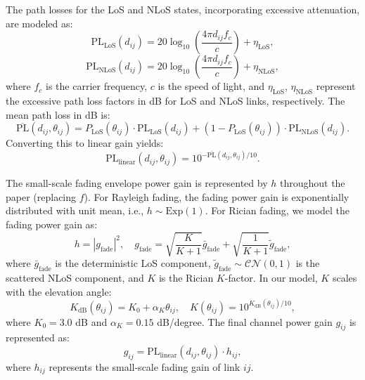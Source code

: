 \documentclass[journal,onecolumn]{IEEEtran}
\begin{document}
The path losses for the LoS and NLoS states, incorporating excessive attenuation, are modeled as:
\begin{equation}
    \text{PL}_{\text{LoS}}(d_{ij}) = 20\log_{10}\left( \frac{4\pi d_{ij} f_c}{c} \right) + \eta_{\text{LoS}},
\end{equation}
\begin{equation}
    \text{PL}_{\text{NLoS}}(d_{ij}) = 20\log_{10}\left( \frac{4\pi d_{ij} f_c}{c} \right) + \eta_{\text{NLoS}},
\end{equation}
where $f_c$ is the carrier frequency, $c$ is the speed of light, and $\eta_{\text{LoS}}$, $\eta_{\text{NLoS}}$ represent the excessive path loss factors in dB for LoS and NLoS links, respectively. The mean path loss in dB is:
\begin{equation}
    \overline{\text{PL}}(d_{ij}, \theta_{ij}) = P_{\text{LoS}}(\theta_{ij}) \cdot \text{PL}_{\text{LoS}}(d_{ij}) + \left(1 - P_{\text{LoS}}(\theta_{ij})\right) \cdot \text{PL}_{\text{NLoS}}(d_{ij}).
\end{equation}
Converting this to linear gain yields:
\begin{equation}
    \text{PL}_{\text{linear}}(d_{ij}, \theta_{ij}) = 10^{-\overline{\text{PL}}(d_{ij}, \theta_{ij}) / 10}.
\end{equation}

The small-scale fading envelope power gain is represented by $h$ throughout the paper (replacing $f$). For Rayleigh fading, the fading power gain is exponentially distributed with unit mean, i.e., $h \sim \text{Exp}(1)$. For Rician fading, we model the fading power gain as:
\begin{equation}
    h = |g_{\text{fade}}|^2, \quad g_{\text{fade}} = \sqrt{\frac{K}{K+1}} \bar{g}_{\text{fade}} + \sqrt{\frac{1}{K+1}} \tilde{g}_{\text{fade}},
\end{equation}
where $\bar{g}_{\text{fade}}$ is the deterministic LoS component, $\tilde{g}_{\text{fade}} \sim \mathcal{CN}(0, 1)$ is the scattered NLoS component, and $K$ is the Rician $K$-factor. In our model, $K$ scales with the elevation angle:
\begin{equation}
    K_{\text{dB}}(\theta_{ij}) = K_0 + \alpha_K \theta_{ij}, \quad K(\theta_{ij}) = 10^{K_{\text{dB}}(\theta_{ij}) / 10},
\end{equation}
where $K_0 = 3.0$ dB and $\alpha_K = 0.15$ dB/degree. The final channel power gain $g_{ij}$ is represented as:
\begin{equation}
    g_{ij} = \text{PL}_{\text{linear}}(d_{ij}, \theta_{ij}) \cdot h_{ij},
\end{equation}
where $h_{ij}$ represents the small-scale fading gain of link $ij$.
\end{document}
